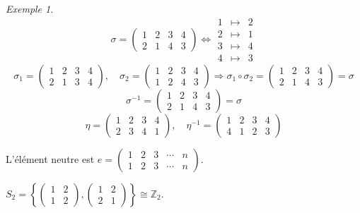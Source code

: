 \documentclass{report}
\newcommand*{\entiers}{\mathbb{Z}}
\theoremstyle{definition}
\theoremstyle{remark}
\newtheorem*{exem}{Exemple}
\begin{document}
	\begin{exem}
		\[
		\sigma=\begin{pmatrix}
			1&2&3&4\\
			2&1&4&3
		\end{pmatrix}
		\Longleftrightarrow
		\begin{array}{rcl}
			1&\mapsto&2\\
			2&\mapsto&1\\
			3&\mapsto&4\\
			4&\mapsto&3
		\end{array}
		\]
		\[
		\sigma_1=\begin{pmatrix}
			1&2&3&4\\
			2&1&3&4
		\end{pmatrix}
		,\quad
		\sigma_2=\begin{pmatrix}
			1&2&3&4\\
			1&2&4&3
		\end{pmatrix}
		\Longrightarrow
		\sigma_1 \circ \sigma_2=\begin{pmatrix}
			1&2&3&4\\
			2&1&4&3
		\end{pmatrix}=\sigma
		\]
		\[
		\sigma^{-1}=\begin{pmatrix}
			1&2&3&4\\
			2&1&4&3
		\end{pmatrix}=\sigma
		\]
		\[
		\eta=\begin{pmatrix}
			1&2&3&4\\
			2&3&4&1
		\end{pmatrix}
		,\quad \eta^{-1}=\begin{pmatrix}
			1&2&3&4\\
			4&1&2&3
		\end{pmatrix}
		\]

		L'\'el\'ement neutre est $e=\begin{pmatrix}
			1&2&3&\dotsb&n\\
			1&2&3&\dotsb&n
		\end{pmatrix}$.

		$S_2 = \left\lbrace \begin{pmatrix}
			1&2\\1&2
		\end{pmatrix}, \begin{pmatrix}
			1&2\\2&1
		\end{pmatrix} \right\rbrace \cong \entiers_2$.


\end{exem}
\end{document}
